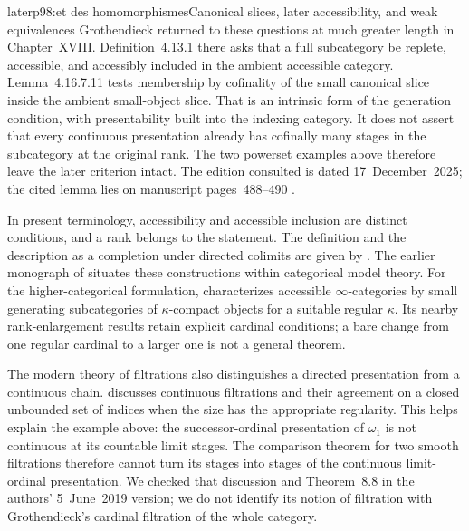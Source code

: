 \begin{dcomment}{later}{p98:et des homomorphismes}{Canonical slices, later accessibility, and weak equivalences}
Grothendieck returned to these questions at much greater length in Chapter~XVIII. Definition~4.13.1 there asks that a full subcategory be replete, accessible, and accessibly included in the ambient accessible category. Lemma~4.16.7.11 tests membership by cofinality of the small canonical slice inside the ambient small-object slice. That is an intrinsic form of the generation condition, with presentability built into the indexing category. It does not assert that every continuous presentation already has cofinally many stages in the subcategory at the original rank. The two powerset examples above therefore leave the later criterion intact. The edition consulted is dated 17~December~2025; the cited lemma lies on manuscript pages~488--490 \citep{Grothendieck1990XVIII}.

In present terminology, accessibility and accessible inclusion are distinct conditions, and a rank belongs to the statement. The definition and the description as a completion under directed colimits are given by \citet[Definition~2.1 and Theorem~2.26]{AdamekRosicky1994}. The earlier monograph of \citet{MakkaiPare1989} situates these constructions within categorical model theory. For the higher-categorical formulation, \citet[Proposition~5.4.2.2]{Lurie2009HTT} characterizes accessible $\infty$-categories by small generating subcategories of $\kappa$-compact objects for a suitable regular $\kappa$. Its nearby rank-enlargement results retain explicit cardinal conditions; a bare change from one regular cardinal to a larger one is not a general theorem.

The modern theory of filtrations also distinguishes a directed presentation from a continuous chain. \citet[\S8, especially Lemma~8.4 and the following paragraph]{LiebermanRosickyVasey2020} discusses continuous filtrations and their agreement on a closed unbounded set of indices when the size has the appropriate regularity. This helps explain the example above: the successor-ordinal presentation of $\omega_1$ is not continuous at its countable limit stages. The comparison theorem for two smooth filtrations therefore cannot turn its stages into stages of the continuous limit-ordinal presentation. We checked that discussion and Theorem~8.8 in the authors' 5~June~2019 version; we do not identify its notion of filtration with Grothendieck's cardinal filtration of the whole category.


\end{dcomment}
